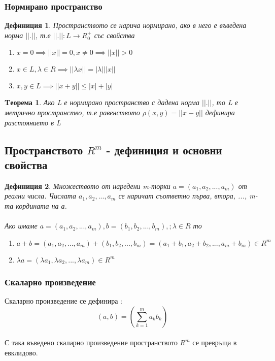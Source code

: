 \documentclass[fleqn]{article}
\newtheorem{theorem}{Tеорема}[subsection]
\newtheorem{definition}{Дефиниция}[subsection]
\begin{document}
\subsubsection{Нормирано пространство}
\begin{definition}
Пространството се нарича нормирано, ако в него е въведена норма $||.||$, т.е $||.||: L \rightarrow R_0^+$ със свойства 
	\begin{enumerate}
 		\item $x = 0  \implies ||x|| = 0, x \neq 0  \implies ||x|| > 0$
		\item $x \in L, \lambda \in R \implies ||\lambda x|| = |\lambda|  ||x||$
		\item $x,y \in L \implies ||x+y|| \leq |x| + |y|$
	\end{enumerate}
\end{definition}
\begin{theorem}
Ако L е нормирано пространство с дадена норма $|| . ||$, то L е метрично пространство, т.е равенството $\rho(x,y) = ||x - y||$ дефинира  разстоянието в L
\end{theorem}

\subsection{Пространството $R^m$ - дефиниция и основни свойства}

\begin{definition}
Множеството от наредени m-торки $a = (a_1, a_2, ... , a_m)$ от реални числа. Числата $a_1, a_2, ... , a_m$ се наричат съответно първа, втора, ..., m-та кордината на а.\\
\\
 Ако имаме $a = (a_1, a_2, ... , a_m), b = (b_1, b_2, ... , b_m), ; \lambda \in R $ то
	\begin{enumerate}
		\item $a+b =(a_1, a_2, ... , a_m) +  (b_1, b_2, ... , b_m) = (a_1 + b_1, a_2+b_2, ... , a_m + b_m) \in R^m$
		\item $ \lambda a =(\lambda a_1,\lambda a_2, ... , \lambda a_m) \in R^m $\\
	\end{enumerate}
\end{definition}
\subsubsection{Скаларно произведение}
Скаларно произведение се дефинира : $$ (a,b) = \left( \sum_{k=1}^{m}a_kb_k \right )$$\\
С така въведено скаларно произведение пространството $R^m$ се превръща в евклидово.
\end{document}
